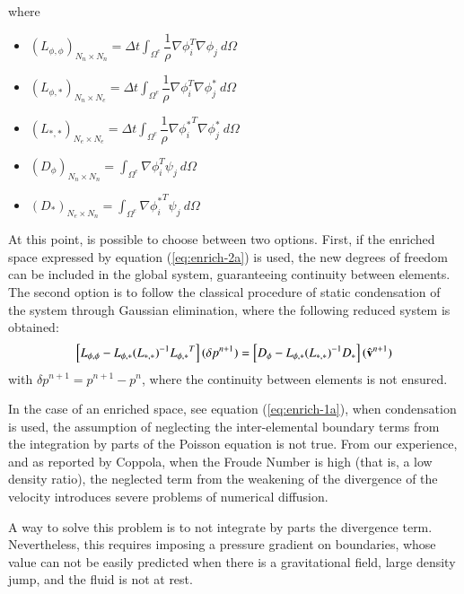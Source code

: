 where
\begin{itemize}
 \item ${(L_{\phi,\phi})}_{N_n\times N_n} = \Delta t \displaystyle \int_{\Omega^e} \dfrac{1}{\rho} \nabla \phi_i^T \nabla \phi_j \ d\Omega$
 \item ${(L_{\phi,*})}_{N_n\times N_e} = \Delta t \displaystyle \int_{\Omega^e} \dfrac{1}{\rho} \nabla \phi_i^T \nabla \phi_j^* \ d\Omega$
 \item ${(L_{*,*})}_{N_e\times N_e} = \Delta t \displaystyle \int_{\Omega^e} \dfrac{1}{\rho} \nabla {\phi_i^*}^T \nabla \phi_j^* \ d\Omega$
 \item ${(D_{\phi})}_{N_n\times N_n} = \displaystyle \int_{\Omega^e} \nabla \phi_i^T \psi_j \ d\Omega$
 \item ${(D_*)}_{N_e\times N_n} = \displaystyle \int_{\Omega^e}  \nabla {\phi_i^*}^T \psi_j \ d\Omega$
\end{itemize}

At this point, is possible to choose between two options. First, if the enriched space expressed by equation (\ref{eq:enrich-2a}) is used, the new degrees of freedom can be included in the global system, guaranteeing continuity between elements. The second option is to follow the classical procedure of static condensation of the system through Gaussian elimination\cite{Felippa04}, where the following reduced system is obtained:
  \begin{equation}
   \left[L_{\phi,\phi} - L_{\phi,*}{(L_{*,*})}^{-1}{L_{\phi,*}}^T\right](\delta p^{n+1}) = \left[D_{\phi}- L_{\phi,*}{(L_{*,*})}^{-1}D_{*}\right](\hat{\mathbf{v}}^{n+1})
   \label{condensing}
  \end{equation}
with $\delta p^{n+1} = p^{n+1}-p^{n}$, where the continuity between elements is not ensured.


In the case of an enriched space, see equation (\ref{eq:enrich-1a}), when condensation is used, the assumption of neglecting the inter-elemental boundary terms from the integration by parts of the Poisson equation is not true. From our experience, and as reported by Coppola\cite{Coppola05}, when the Froude Number is high (that is, a low density ratio), the neglected term from the weakening of the divergence of the velocity introduces severe problems of numerical diffusion.

A way to solve this problem is to not integrate by parts the divergence term. Nevertheless, this requires imposing a pressure gradient on boundaries, whose value can not be easily predicted when there is a gravitational field, large density jump, and the fluid is not at rest.

